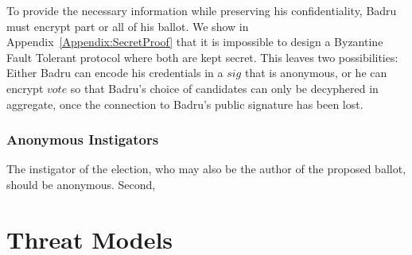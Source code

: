   To provide the necessary information while preserving his
  confidentiality, Badru must encrypt part or all of his ballot. We show
  in Appendix~\ref{Appendix:SecretProof} that it is impossible to design
  a Byzantine Fault Tolerant protocol where both are kept secret. This leaves
  two possibilities: Either Badru can encode his credentials in a $sig$ that is
  anonymous\cite{lrs}, or he can
  encrypt $vote$ so that Badru's choice of candidates can only be decyphered in
  aggregate, once the connection to Badru's public signature has been lost.

  \subsubsection{Anonymous Instigators}
  The instigator of the election, who may also be the author of the proposed
  ballot, should be anonymous. Second,

\section{Threat Models}
